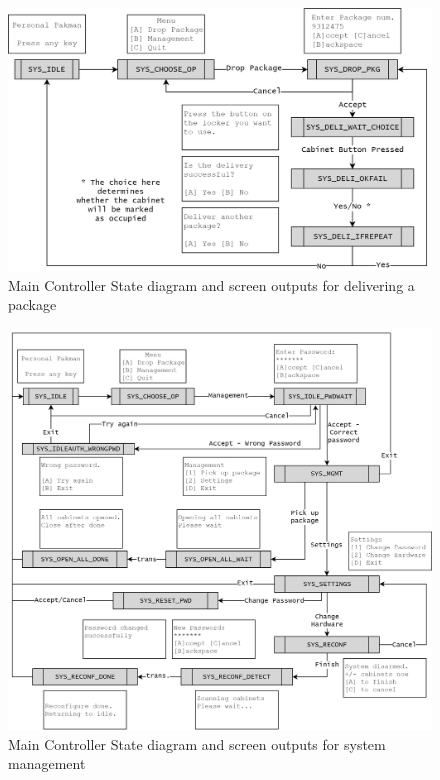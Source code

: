 \documentclass{article}
\begin{document}
\begin{figure}
\centering\includegraphics[width=\columnwidth]{pkg_logic.png}
\caption{Main Controller State diagram and screen outputs for delivering a package}
\end{figure}
\begin{figure}
\centering\includegraphics[width=\columnwidth]{pkg_mgmt.png}
\caption{Main Controller State diagram and screen outputs for system management}
\end{figure}
\end{document}
